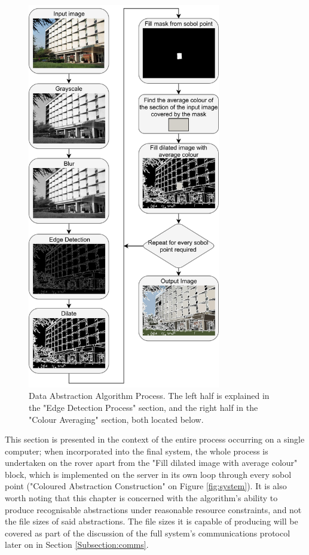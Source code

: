 \begin{figure}[H]
    \begin{center}
      \includegraphics[width=0.75\textwidth]{Figures/Abstraction.jpg}
      \caption[Data Abstraction Algorithm Process]{Data Abstraction Algorithm Process. The left half is explained in the "Edge Detection Process" section, and the right half in the "Colour Averaging" section, both located below.}
      \label{fig:process}
    \end{center}
\end{figure}

This section is presented in the context of the entire process occurring on a single computer; when incorporated into the final system, the whole process is undertaken on the rover apart from the "Fill dilated image with average colour" block, which is implemented on the server in its own loop through every sobol point ("Coloured Abstraction Construction" on Figure \ref{fig:system}). It is also worth noting that this chapter is concerned with the algorithm's ability to produce recognisable abstractions under reasonable resource constraints, and not the file sizes of said abstractions. The file sizes it is capable of producing will be covered as part of the discussion of the full system's communications protocol later on in Section \ref{Subsection:comms}.

